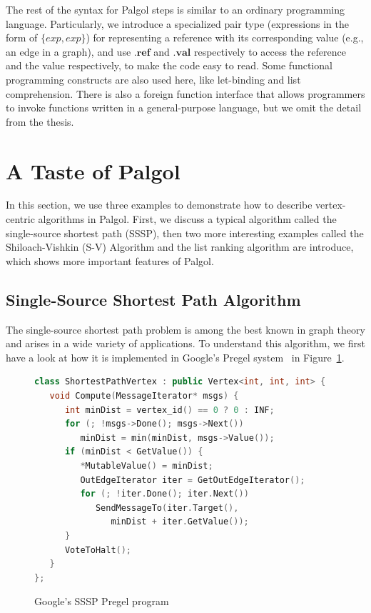 \documentclass{sokendai_thesis} %
\begin{document}
The rest of the syntax for Palgol steps is similar to an ordinary programming language.
Particularly, we introduce a specialized pair type (expressions in the form of $\{\mathit{exp},\mathit{exp}\}$) for representing a reference with its corresponding value (e.g., an edge in a graph), and use $.\mathbf{ref}$ and $.\mathbf{val}$ respectively to access the reference and the value respectively, to make the code easy to read.
Some functional programming constructs are also used here, like let-binding and list comprehension.
There is also a foreign function interface that allows programmers to invoke functions written in a general-purpose language, but we omit the detail from the thesis.

\section{A Taste of Palgol}
\label{sec:taste}

In this section, we use three examples to demonstrate how to describe vertex-centric algorithms in Palgol.
First, we discuss a typical algorithm called the single-source shortest path (SSSP), then two more interesting examples called the Shiloach-Vishkin (S-V) Algorithm and the list ranking algorithm are introduce, which shows more important features of Palgol.

\subsection{Single-Source Shortest Path Algorithm}
\label{sec:sssp}

The single-source shortest path problem is among the best known in graph theory and arises in a wide variety of applications.
To understand this algorithm, we first have a look at how it is implemented in Google's Pregel system~\cite{pregel} in Figure~\ref{fig:sssp-pregel}.
\begin{figure}[thp]
\vspace{-2ex}
\begin{lstlisting}[basicstyle=\small\ttfamily,numbers=none,language=c++]
class ShortestPathVertex : public Vertex<int, int, int> {
   void Compute(MessageIterator* msgs) {
      int minDist = vertex_id() == 0 ? 0 : INF;
      for (; !msgs->Done(); msgs->Next())
         minDist = min(minDist, msgs->Value());
      if (minDist < GetValue()) {
         *MutableValue() = minDist;
         OutEdgeIterator iter = GetOutEdgeIterator();
         for (; !iter.Done(); iter.Next())
            SendMessageTo(iter.Target(),
               minDist + iter.GetValue());
      }
      VoteToHalt();
   }
};
\end{lstlisting}
\vspace{-2ex}
\caption{Google's SSSP Pregel program~\protect\cite{pregel}}
\label{fig:sssp-pregel}
\end{figure}
\end{document}
